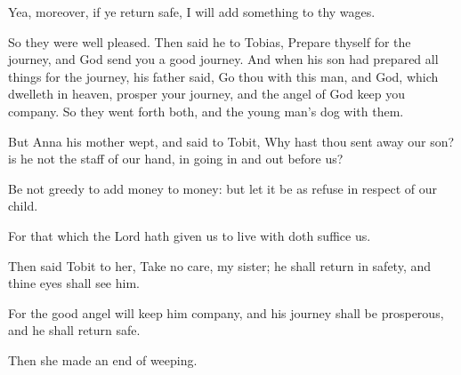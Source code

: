 {\par }{\PP {}Yea, moreover, if ye return safe, I will add something to thy wages.
\par }{\PP {}So they were well pleased. Then said he to Tobias, Prepare thyself for the journey, and God send you a good journey. And when his son had prepared all things for the journey, his father said, Go thou with this man, and God, which dwelleth in heaven, prosper your journey, and the angel of God keep you company. So they went forth both, and the young man’s dog with them.
\par }{\PP {}But Anna his mother wept, and said to Tobit, Why hast thou sent away our son? is he not the staff of our hand, in going in and out before us?
\par }{\PP {}Be not greedy to add money to money: but let it be as refuse in respect of our child.
\par }{\PP {}For that which the Lord hath given us to live with doth suffice us.
\par }{\PP {}Then said Tobit to her, Take no care, my sister; he shall return in safety, and thine eyes shall see him.
\par }{\PP {}For the good angel will keep him company, and his journey shall be prosperous, and he shall return safe.
\par }{\PP {}Then she made an end of weeping.

}
